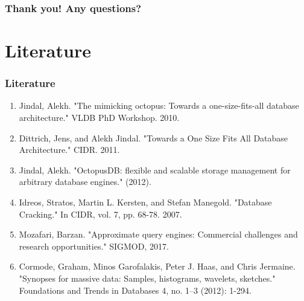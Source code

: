 \documentclass{beamer}
\begin{document}
\begin{frame}
 \frametitle{Thank you! Any questions?}
\end{frame}

\section{Literature}
\begin{frame}
\frametitle{Literature}
\begin{enumerate}
\item{Jindal, Alekh. "The mimicking octopus: Towards a one-size-fits-all database architecture." VLDB PhD Workshop. 2010.}
\item{Dittrich, Jens, and Alekh Jindal. "Towards a One Size Fits All Database Architecture." CIDR. 2011.}
\item{Jindal, Alekh. "OctopusDB: flexible and scalable storage management for arbitrary database engines." (2012).}
\item{Idreos, Stratos, Martin L. Kersten, and Stefan Manegold. "Database Cracking." In CIDR, vol. 7, pp. 68-78. 2007.}
\item{Mozafari, Barzan. "Approximate query engines: Commercial challenges and research opportunities." SIGMOD, 2017.}
\item{Cormode, Graham, Minos Garofalakis, Peter J. Haas, and Chris Jermaine. "Synopses for massive data:
Samples, histograms, wavelets, sketches." Foundations and Trends in Databases 4, no. 1–3 (2012): 1-294.}
\end{enumerate}
\end{frame}
\end{document}

